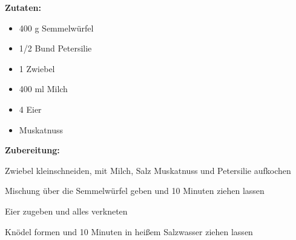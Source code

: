 

\textbf {Zutaten:} \\
\begin{itemize}
	\item 400 g Semmelwürfel
	\item 1/2 Bund Petersilie
	\item 1 Zwiebel
	\item 400 ml Milch
	\item 4 Eier
	\item Muskatnuss
\end{itemize}

\vspace* {2cm}

\textbf {Zubereitung:} \\
\begin{compactenum}
	\item Zwiebel kleinschneiden, mit Milch, Salz Muskatnuss und Petersilie aufkochen
	\item Mischung über die Semmelwürfel geben und 10 Minuten ziehen lassen
	\item Eier zugeben und alles verkneten
	\item Knödel formen und 10 Minuten in heißem Salzwasser ziehen lassen
\end{compactenum}



